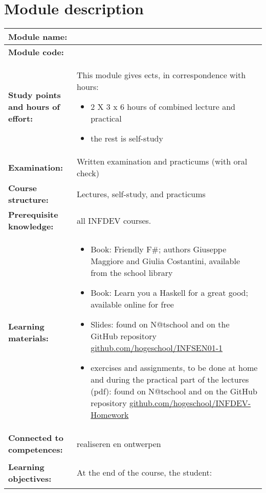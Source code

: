 \section*{Module description}
\begin{tabularx}{\textwidth}{|>{\columncolor{lichtGrijs}} p{}|X|}
	\hline
	\textbf{Module name:} & \modulenaam\\

	\hline
	\textbf{Module code: }& \modulecode\\
	\hline
	\textbf{Study points \newline and hours of effort:} & This module gives \stdPunten{}  ects, in correspondence with \FPeval{\result}{clip(\stdPunten*28)}\result{} hours:
	\begin{itemize}
		\item 2 X 3 x 6 hours of combined lecture and practical
		\item the rest is self-study
	\end{itemize} \\
	\hline
	\textbf{Examination:} & Written examination and practicums (with oral check) \\
	\hline
	\textbf{Course structure:} & Lectures, self-study, and practicums \\
	\hline
	\textbf{Prerequisite knowledge:} & all INFDEV courses. \\
	\hline
	\textbf{Learning materials:}  &
		\begin{itemize}
			\item Book: Friendly F\#; authors Giuseppe Maggiore and Giulia Costantini, available from the school library
			\item Book: Learn you a Haskell for a great good; available online for free
			\item Slides: found on N@tschool and on the GitHub repository \href{https://github.com/hogeschool/INFSEN01-1}{github.com/hogeschool/INFSEN01-1}
			\item exercises and assignments, to be done at home and during the practical part of the lectures (pdf): found on N@tschool and on the GitHub repository \href{https://github.com/hogeschool/INFDEV-Homework}{github.com/hogeschool/INFDEV-Homework}
		\end{itemize} \\
	\hline
	\textbf{Connected to competences:} & realiseren en ontwerpen \\
	\hline
	\textbf{Learning objectives:} &
		At the end of the course, the student:
			\begin{itemize}

\end{itemize}
\end{tabularx}
